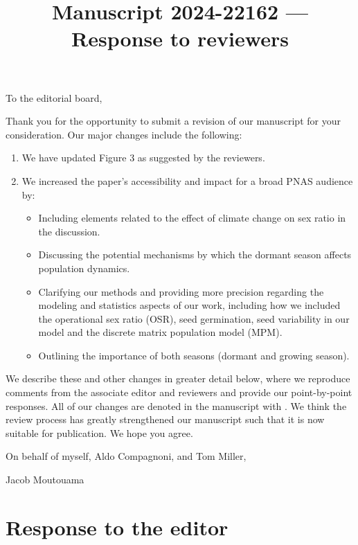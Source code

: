 \documentclass[12pt]{article}
\newcommand{\revise}[1]{{\color{Mahogany}{#1}}}
\begin{document}
\title{Manuscript 2024-22162 --- Response to reviewers}

\maketitle
\noindent To the editorial board,

Thank you for the opportunity to submit a revision of our manuscript for your consideration. Our major changes include the following:
\begin{enumerate}
	\item We have updated  Figure 3 as suggested by the reviewers.
	\item We increased the paper’s accessibility and impact for a broad PNAS audience by: 
	\begin{itemize}
	\item Including elements related to the effect of climate change on sex ratio in the discussion. 
	\item Discussing the potential mechanisms by which the dormant season affects population dynamics.
	\item Clarifying our methods and providing more precision regarding the modeling and statistics aspects of our work, including how we included the operational sex ratio (OSR), seed germination, seed variability in our model and the discrete matrix population model (MPM).
	\item Outlining the importance of both seasons  (dormant and growing season).
	\end{itemize}
\end{enumerate}

We describe these and other changes in greater detail below, where we reproduce comments from the associate editor and reviewers and provide our point-by-point responses. 
All of our changes are denoted in the manuscript with \revise{Mahogany font}.
We think the review process has greatly strengthened our manuscript such that it is now suitable for publication.
We hope you agree. 

\vspace{2em}
\hfill On behalf of myself, Aldo Compagnoni, and Tom Miller,

\hfill  Jacob Moutouama
\newpage

\section{Response to  the editor}
\vspace{-2em}
\end{document}
